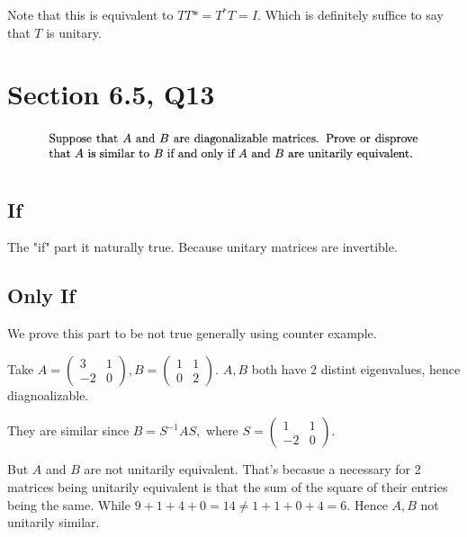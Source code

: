 \documentclass[12pt]{article}%
\begin{document}
Note that this is equivalent to $TT*=T^*T=I.$ Which is definitely 
suffice to say that $T$ is unitary.


\newpage

\section{Section 6.5, Q13}
\begin{figure}[htp]
    \centering %
    \includegraphics[width = 16cm]{img/Q10.png}
\end{figure}

\subsection{If}
The "if" part it naturally true. Because unitary matrices are invertible.

\subsection{Only If}
We prove this part to be not true generally using counter example. 

Take $A=\begin{pmatrix} 3&1\\-2&0 \end{pmatrix}, 
B=\begin{pmatrix} 1&1\\0&2 \end{pmatrix}.$ $A,B$ both have 2 distint eigenvalues, hence diagnoalizable.

They are similar since $B=S^{-1}AS,$ where 
$S=\begin{pmatrix} 1&1\\-2&0 \end{pmatrix}.$

But $A$ and $B$ are not unitarily equivalent. 
That's becasue a necessary for 2 matrices being unitarily equivalent is that the sum of the square of their entries being the same.
While $9+1+4+0=14 \neq 1+1+0+4 =6.$ Hence $A,B$ not unitarily similar.
\end{document}
